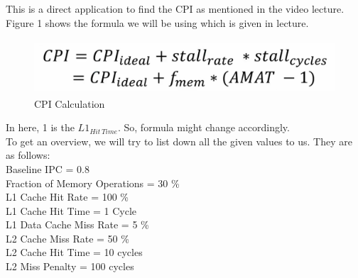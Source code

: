 \documentclass[12pt]{article}
\begin{document}
\maketitle


\section{}
This is a direct application to find the CPI as mentioned in the video lecture. Figure 1 shows the formula we will be using which is given in lecture.

\begin{figure}
    \centering
    \includegraphics[width = 13cm, height = 2cm]{Assignment-12/Formula1.png}
    \caption{CPI Calculation}
\end{figure}
In here, 1 is the $L1_{Hit \, Time}$. So, formula might change accordingly. \\
To get an overview, we will try to list down all the given values to us. They are as follows: \\
Baseline IPC = 0.8 \\
Fraction of Memory Operations = 30 \% \\
L1 Cache Hit Rate = 100 \% \\
L1 Cache Hit Time = 1 Cycle \\
L1 Data Cache Miss Rate = 5 \% \\
L2 Cache Miss Rate = 50 \% \\
L2 Cache Hit Time = 10 cycles \\
L2 Miss Penalty = 100 cycles \\
\end{document}
